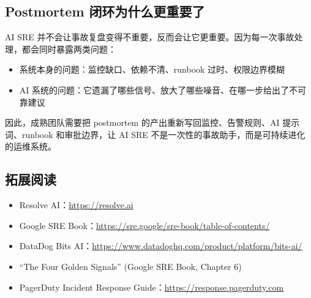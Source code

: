 \subsection{Postmortem 闭环为什么更重要了}

AI SRE 并不会让事故复盘变得不重要，反而会让它更重要。因为每一次事故处理，都会同时暴露两类问题：

\begin{itemize}
    \item 系统本身的问题：监控缺口、依赖不清、runbook 过时、权限边界模糊
    \item AI 系统的问题：它遗漏了哪些信号、放大了哪些噪音、在哪一步给出了不可靠建议
\end{itemize}

因此，成熟团队需要把 postmortem 的产出重新写回监控、告警规则、AI 提示词、runbook 和审批边界，让 AI SRE 不是一次性的事故助手，而是可持续进化的运维系统。

\subsection{拓展阅读}

\begin{itemize}
    \item Resolve AI：\url{https://resolve.ai}
    \item Google SRE Book：\url{https://sre.google/sre-book/table-of-contents/}
    \item DataDog Bits AI：\url{https://www.datadoghq.com/product/platform/bits-ai/}
    \item ``The Four Golden Signals'' (Google SRE Book, Chapter 6)
    \item PagerDuty Incident Response Guide：\url{https://response.pagerduty.com}
\end{itemize}



